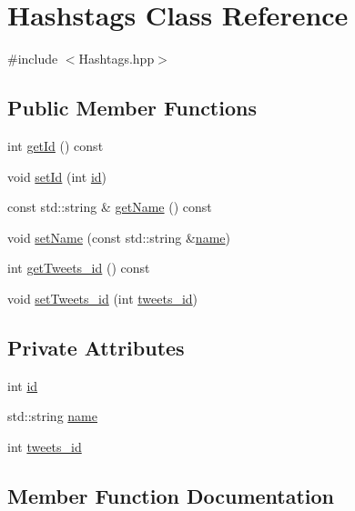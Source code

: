 \hypertarget{class_hashstags}{}\section{Hashstags Class Reference}
\label{class_hashstags}


{\ttfamily \#include $<$Hashtags.\+hpp$>$}

\subsection*{Public Member Functions}
\begin{DoxyCompactItemize}
\item 
int \hyperlink{class_hashstags_ae7cf97de72cbf448027f5c9ab899bab6}{get\+Id} () const
\item 
void \hyperlink{class_hashstags_a87ba5f3b5ac660cc77da89cf031937b7}{set\+Id} (int \hyperlink{class_hashstags_a8ce7825910c6342b0133c4288ffad690}{id})
\item 
const std\+::string \& \hyperlink{class_hashstags_a3da6626a13466e74959f06cd6d253460}{get\+Name} () const
\item 
void \hyperlink{class_hashstags_aa3ada9fed3c4ccfd25972abad7f587fc}{set\+Name} (const std\+::string \&\hyperlink{class_hashstags_aee4579d5953767b4e96374b946d41e77}{name})
\item 
int \hyperlink{class_hashstags_a2c9009162ccedb528404f0d1be60c994}{get\+Tweets\+\_\+id} () const
\item 
void \hyperlink{class_hashstags_ae2b6ea5459d4c9bc35ed446982c4d2c2}{set\+Tweets\+\_\+id} (int \hyperlink{class_hashstags_af1cf690e31ce16188b5b6de7a72c3cfc}{tweets\+\_\+id})
\end{DoxyCompactItemize}
\subsection*{Private Attributes}
\begin{DoxyCompactItemize}
\item 
int \hyperlink{class_hashstags_a8ce7825910c6342b0133c4288ffad690}{id}
\item 
std\+::string \hyperlink{class_hashstags_aee4579d5953767b4e96374b946d41e77}{name}
\item 
int \hyperlink{class_hashstags_af1cf690e31ce16188b5b6de7a72c3cfc}{tweets\+\_\+id}
\end{DoxyCompactItemize}


\subsection{Member Function Documentation}
\mbox{\label{class_hashstags_ae7cf97de72cbf448027f5c9ab899bab6}} 
